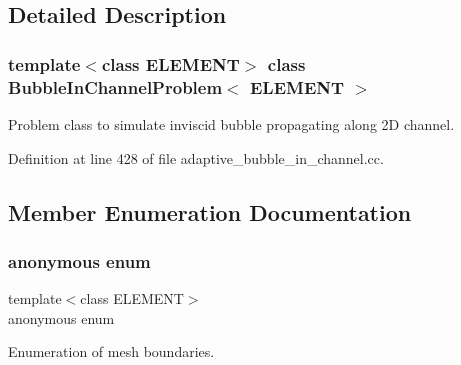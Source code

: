 \subsection{Detailed Description}
\subsubsection*{template$<$class E\+L\+E\+M\+E\+NT$>$\newline
class Bubble\+In\+Channel\+Problem$<$ E\+L\+E\+M\+E\+N\+T $>$}

Problem class to simulate inviscid bubble propagating along 2D channel. 

Definition at line 428 of file adaptive\+\_\+bubble\+\_\+in\+\_\+channel.\+cc.



\subsection{Member Enumeration Documentation}
\mbox{\label{classBubbleInChannelProblem_a5cc2eecaafc178aa80ab1e66bb909fa9}} 
\subsubsection{\texorpdfstring{anonymous enum}{anonymous enum}}
{\footnotesize\ttfamily template$<$class E\+L\+E\+M\+E\+NT$>$ \\
anonymous enum\hspace{0.3cm}{\ttfamily [private]}}



Enumeration of mesh boundaries. 

